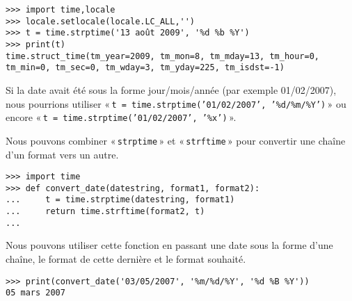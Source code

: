 \begin{Verbatim}[frame=single,rulecolor=\color{gray}]
>>> import time,locale
>>> locale.setlocale(locale.LC_ALL,'')
>>> t = time.strptime('13 août 2009', '%d %b %Y')
>>> print(t)
time.struct_time(tm_year=2009, tm_mon=8, tm_mday=13, tm_hour=0, 
tm_min=0, tm_sec=0, tm_wday=3, tm_yday=225, tm_isdst=-1)
\end{Verbatim}

Si la date avait été sous la forme jour/mois/année (par exemple 01/02/2007), nous pourrions utiliser « \texttt{t = time.strptime('01/02/2007', '\%d/\%m/\%Y')} » ou encore « \texttt{t = time.strptime('01/02/2007', '\%x')} ».


Nous pouvons combiner « \texttt{strptime} » et « \texttt{strftime} » pour convertir une chaîne d'un format vers un autre.

\begin{Verbatim}[frame=single,rulecolor=\color{gray}]
>>> import time
>>> def convert_date(datestring, format1, format2):
...     t = time.strptime(datestring, format1)
...     return time.strftime(format2, t)
...
\end{Verbatim}

Nous pouvons utiliser cette fonction en passant une date sous la forme d'une chaîne, le format de cette dernière et le format souhaité.


\begin{Verbatim}[frame=single,rulecolor=\color{gray}]
>>> print(convert_date('03/05/2007', '%m/%d/%Y', '%d %B %Y'))
05 mars 2007
\end{Verbatim}
